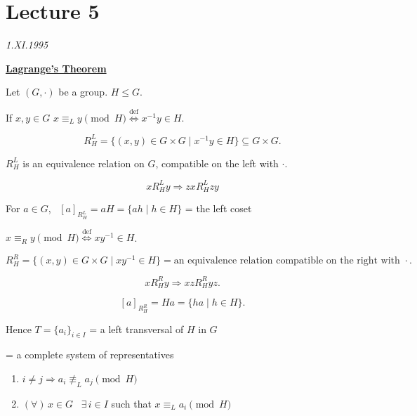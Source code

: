 \bigskip

\section{Lecture 5}



\begin{center}
\end{center}
\begin{flushright}
\textit{1.XI.1995}
\end{flushright}

\bigskip
\noindent\underline{\textbf{Lagrange's Theorem}}

\bigskip
\noindent Let $(G,\cdot)$ be a group. $H\leq G$.

\noindent If $x,y\in G$ \quad $x\equiv_L y \pmod H \overset{\text{def}}{\Longleftrightarrow} x^{-1}y\in H$.

\[
R_H^L = \{(x,y)\in G\times G \mid x^{-1}y\in H\} \subseteq G\times G.
\]

\noindent $R_H^L$ is an equivalence relation on $G$, compatible on the left with $\cdot$.

\[
xR_H^L y \Rightarrow zxR_H^L zy
\]

\noindent For $a\in G$, \ $[a]_{R_H^L} = aH = \{ah \mid h\in H\}$ = the left coset

\bigskip
\noindent $x\equiv_R y \pmod H \overset{\text{def}}{\Longleftrightarrow} xy^{-1}\in H$.

\[
R_H^R = \{(x,y)\in G\times G \mid xy^{-1}\in H\} = \text{an equivalence relation compatible on the right with } \cdot.
\]

\[
xR_H^R y \Rightarrow xzR_H^R yz.
\]

\[
[a]_{R_H^R} = Ha = \{ha \mid h\in H\}.
\]

\bigskip
\noindent Hence $T=\{a_i\}_{i\in I}$ = a left transversal of $H$ in $G$

\noindent = a complete system of representatives

\begin{enumerate}
\item[1)] $i\neq j \Rightarrow a_i \not\equiv_L a_j \pmod H$
\item[2)] $(\forall)\, x\in G$ \ $\exists\, i\in I$ such that $x\equiv_L a_i \pmod H$
\end{enumerate}


